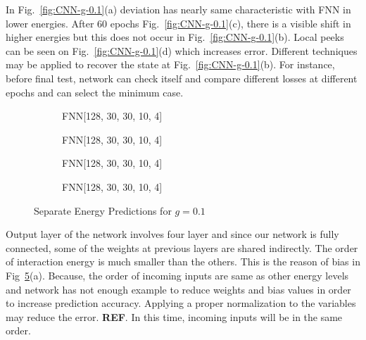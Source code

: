 \documentclass[a4paper,times,12pt]{article}
\begin{document}
In Fig.~\ref{fig:CNN-g-0.1}(a) deviation has nearly same characteristic with FNN in lower energies. After 60 epochs Fig.~\ref{fig:CNN-g-0.1}(c), there is a visible shift in higher energies but this does not occur in Fig.~\ref{fig:CNN-g-0.1}(b). Local peeks can be seen on Fig.~\ref{fig:CNN-g-0.1}(d) which increases error. Different techniques may be applied to recover the state at Fig.~\ref{fig:CNN-g-0.1}(b). For instance, before final test, network can check itself and compare different losses at different epochs and can select the minimum case. 


\begin{figure}[H]
    \centering
    \begin{subfigure}[t]{0.45\textwidth}
		\centering
        
        \caption{FNN[128, 30, 30, 10, 4]}
		\label{fig:a}
    \end{subfigure}
    \begin{subfigure}[t]{0.45\textwidth}
		\centering
        
        \caption{FNN[128, 30, 30, 10, 4]}
		\label{fig:b}
    \end{subfigure}    
    \begin{subfigure}[t]{0.45\textwidth}
        \centering
        
        \caption{FNN[128, 30, 30, 10, 4]}
		\label{fig:c}
    \end{subfigure}
    \begin{subfigure}[t]{0.45\textwidth}
        \centering
        
        \caption{FNN[128, 30, 30, 10, 4]}
		\label{fig:c}
    \end{subfigure}
	\caption{Separate Energy Predictions for $g = 0.1$ }
\label{fig:FFN-g-0.1-S}
\end{figure}


Output layer of the network involves four layer and since our network is fully connected, some of the weights at previous layers are shared indirectly. The order of interaction energy is much smaller than the others. This is the reason of bias in Fig~\ref{fig:FFN-g-0.1-S}(a). Because, the order of incoming inputs are same as other energy levels and network has not enough example to reduce weights and bias values in order to increase prediction accuracy. Applying a proper normalization to the variables may reduce the error. \textbf{REF}. In this time, incoming inputs will be in the same order.
\end{document}
